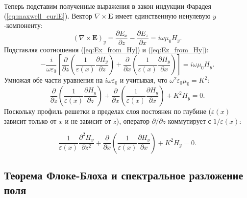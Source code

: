 \documentclass[a4paper,11pt]{article}
\begin{document}
Теперь подставим полученные выражения в закон индукции Фарадея (\ref{eq:maxwell_curlE}). Вектор $\nabla \times \mathbf{E}$ имеет единственную ненулевую $y$-компоненту:
\begin{equation}
    (\nabla \times \mathbf{E})_y = \frac{\partial E_x}{\partial z} - \frac{\partial E_z}{\partial x} = i \omega \mu_0 H_y.
\end{equation}
Подставляя соотношения (\ref{eq:Ex_from_Hy}) и (\ref{eq:Ez_from_Hy}):
\begin{equation}
    -\frac{i}{\omega \varepsilon_0} \left[ \frac{\partial}{\partial z} \left( \frac{1}{\varepsilon(x)} \frac{\partial H_y}{\partial z} \right) + \frac{\partial}{\partial x} \left( \frac{1}{\varepsilon(x)} \frac{\partial H_y}{\partial x} \right) \right] = i \omega \mu_0 H_y.
\end{equation}
Умножая обе части уравнения на $i \omega \varepsilon_0$ и учитывая, что $\omega^2 \varepsilon_0 \mu_0 = K^2$:
\begin{equation}
    \frac{\partial}{\partial z} \left( \frac{1}{\varepsilon(x)} \frac{\partial H_y}{\partial z} \right) + \frac{\partial}{\partial x} \left( \frac{1}{\varepsilon(x)} \frac{\partial H_y}{\partial x} \right) + K^2 H_y = 0.
\end{equation}
Поскольку профиль решетки в пределах слоя постоянен по глубине ($\varepsilon(x)$ зависит только от $x$ и не зависит от $z$), оператор $\partial / \partial z$ коммутирует с $1/\varepsilon(x)$:
\begin{mathbox}
\begin{equation}
    \frac{1}{\varepsilon(x)} \frac{\partial^2 H_y}{\partial z^2} + \frac{\partial}{\partial x} \left( \frac{1}{\varepsilon(x)} \frac{\partial H_y}{\partial x} \right) + K^2 H_y = 0.
    \label{eq:wave_Hy_master}
\end{equation}
\end{mathbox}

\subsection{Теорема Флоке-Блоха и спектральное разложение поля}
\end{document}
